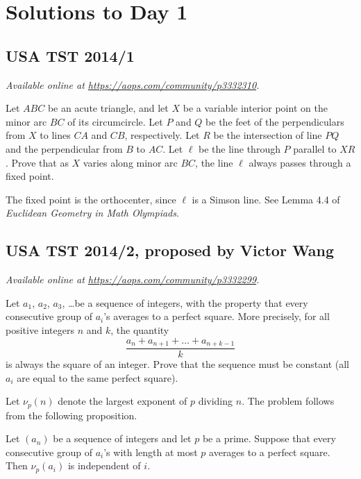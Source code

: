\documentclass[11pt]{scrartcl}
\begin{document}
\section{Solutions to Day 1}
\subsection{USA TST 2014/1}
\textsl{Available online at \url{https://aops.com/community/p3332310}.}
\begin{mdframed}[style=mdpurplebox,frametitle={Problem statement}]
Let $ABC$ be an acute triangle, and let $X$ be a variable interior point
on the minor arc $BC$ of its circumcircle.
Let $P$ and $Q$ be the feet of the perpendiculars from $X$ to lines $CA$ and $CB$, respectively.
Let $R$ be the intersection of line $PQ$ and the perpendicular from $B$ to $AC$.
Let $\ell$ be the line through $P$ parallel to $XR$.
Prove that as $X$ varies along minor arc $BC$,
the line $\ell$ always passes through a fixed point.
\end{mdframed}
The fixed point is the orthocenter,
since $\ell$ is a Simson line.
See Lemma 4.4 of \emph{Euclidean Geometry in Math Olympiads}.
\pagebreak

\subsection{USA TST 2014/2, proposed by Victor Wang}
\textsl{Available online at \url{https://aops.com/community/p3332299}.}
\begin{mdframed}[style=mdpurplebox,frametitle={Problem statement}]
Let $a_1$, $a_2$, $a_3$, \dots be a sequence of integers,
with the property that every consecutive group of $a_i$'s
averages to a perfect square.
More precisely, for all positive integers $n$ and $k$, the quantity
 \[ \frac{a_n + a_{n+1} + \dots + a_{n+k-1}}{k} \]
is always the square of an integer.
Prove that the sequence must be constant
(all $a_i$ are equal to the same perfect square).
\end{mdframed}
Let $\nu_p(n)$ denote the largest exponent of $p$ dividing $n$.
The problem follows from the following proposition.

\begin{proposition*}
  Let $(a_n)$ be a sequence of integers and let $p$ be a prime.
  Suppose that every consecutive group of $a_i$'s
  with length at most $p$ averages to a perfect square.
  Then $\nu_p(a_i)$ is independent of $i$.
\end{proposition*}
\end{document}
